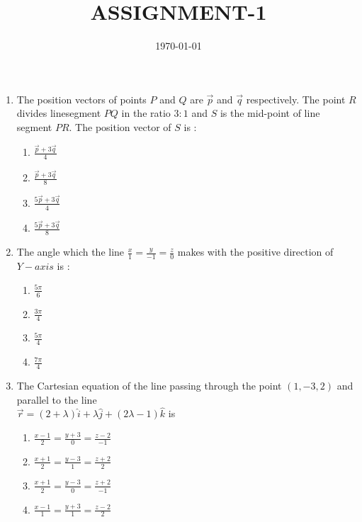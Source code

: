 \documentclass{article}
\title{ASSIGNMENT-1}
\date{\today}
\begin{document}
\begin{enumerate}
		\section{VECTOR GRAPHS}
\item The position vectors of points $P$ and $Q$ are $\vec{p}$ and $\vec{q}$ respectively. The point $R$ divides linesegment $PQ$ in the ratio $3 \colon 1$ and $S$ is the mid-point of line segment $PR$. The position vector of $S$ is :
        \begin{enumerate}[label=(\Alph*)]
                \item $\frac{\vec{p} + 3\vec{q}}{4}$
                \item $\frac{\vec{p} + 3\vec{q}}{8}$
                \item $\frac{5\vec{p} + 3\vec{q}}{4}$
                \item $\frac{5\vec{p} + 3\vec{q}}{8}$
        \end{enumerate}

                                \item The angle which the line $\frac{x}{1} = \frac{y}{-1} = \frac{z}{0} $ makes with the positive direction of $Y-axis$ is :
                                        \begin{enumerate}[label=(\Alph*)]
                                                \item $\frac{5\pi}{6}$
                                                \item $\frac{3\pi}{4}$
                                                \item $\frac{5\pi}{4}$
                                                \item $\frac{7\pi}{4}$
                                        \end{enumerate}

                                \item The Cartesian equation of the line passing through the point $(1,-3,2)$ and parallel to the line\\
                                        $\vec{r} = (2+\lambda)\hat{i} + \lambda \hat{j} + (2\lambda-1)\hat{k}$ is
\begin{enumerate}[label=(\Alph*)]
        \item $\frac{x-1}{2} = \frac{y+3}{0} = \frac{z-2}{-1}$
        \item $\frac{x+1}{2} = \frac{y-3}{1} = \frac{z+2}{2}$
        \item $\frac{x+1}{2} = \frac{y-3}{0} = \frac{z+2}{-1}$
    \item $\frac{x-1}{1} = \frac{y+3}{1} = \frac{z-2}{2}$
\end{enumerate}
\end{enumerate}
\end{document}
